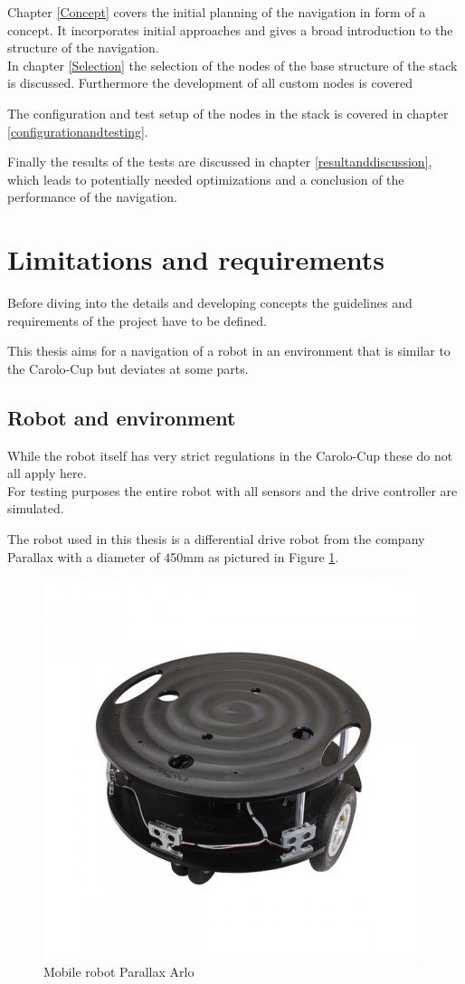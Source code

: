 Chapter \ref{Concept} covers the initial planning of the navigation in form of a concept. It incorporates initial approaches and gives a broad introduction to the structure of the navigation.\\

In chapter \ref{Selection} the selection of the nodes of the base structure of the stack is discussed. Furthermore the development of all custom nodes is covered

The configuration and test setup of the nodes in the stack is covered in chapter \ref{configurationandtesting}.


Finally the results of the tests are discussed in chapter \ref{resultanddiscussion}, which leads to potentially needed optimizations and a conclusion of the performance of the navigation.

\section{Limitations and requirements}

Before diving into the details and developing concepts the guidelines and requirements of the project have to be defined.

This thesis aims for a navigation of a robot in an environment that is similar to the Carolo-Cup but deviates at some parts.

\subsection{Robot and environment}
While the robot itself has very strict regulations in the Carolo-Cup these do not all apply here.\\

For testing purposes the entire robot with all sensors and the drive controller are simulated.

The robot used in this thesis is a differential drive robot from the company Parallax with a diameter of 450mm as pictured in Figure \ref{arlore}.\\

\begin{figure}[H]
	\centering
	\includegraphics[width=.7\textwidth]{arlo real}
	
	\caption{Mobile robot Parallax Arlo \cite{arloreal}}
	\label{arlore}
\end{figure}


